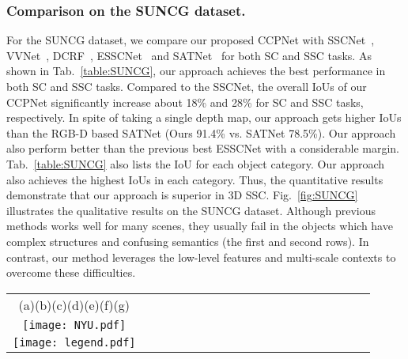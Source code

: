 \documentclass[10pt,twocolumn,letterpaper]{article}
\begin{document}
\subsubsection{Comparison on the SUNCG dataset.}
For the SUNCG dataset, we compare our proposed CCPNet with SSCNet~\cite{song2017semantic}, VVNet~\cite{guo2018view}, DCRF~\cite{zhang2018semantic}, ESSCNet~\cite{zhang2018efficient} and SATNet~\cite{liu2018see} for both SC and SSC tasks.
As shown in Tab.~\ref{table:SUNCG}, our approach achieves the best performance in both SC and SSC tasks.
Compared to the SSCNet, the overall IoUs of our CCPNet significantly increase about 18\% and 28\% for SC and SSC tasks, respectively.
In spite of taking a single depth map, our approach gets higher IoUs than the RGB-D based SATNet (Ours 91.4\% vs. SATNet 78.5\%).
Our approach also perform better than the previous best ESSCNet with a considerable margin.
Tab.~\ref{table:SUNCG} also lists the IoU for each object category.
Our approach also achieves the highest IoUs in each category.
Thus, the quantitative results demonstrate that our approach is superior in 3D SSC.
Fig.~\ref{fig:SUNCG} illustrates the qualitative results on the SUNCG dataset.
Although previous methods works well for many scenes, they usually fail in the objects which have complex structures and confusing semantics (the first and second rows).
In contrast, our method leverages the low-level features and multi-scale contexts to overcome these difficulties.
\begin{figure*}
\centering
\resizebox{1\textwidth}{!}
{
\begin{tabular}{@{}c@{}c@{}c@{}c@{}c@{}c@{}c@{}c@{}c@{}c@{}c@{}c@{}c@{}c@{}c@{}c@{}c@{}c@{}c}
(a)\hspace{2.2cm}(b)\hspace{2cm}(c)\hspace{2cm}(d)\hspace{2cm}(e)\hspace{2cm}(f)\hspace{2.2cm}(g)\\
\texttt{[image: NYU.pdf]} \\
\texttt{[image: legend.pdf]} \\
\end{tabular}
}
\caption{Completion results with different methods on the NYU dataset.
From the left to right: (a) Input Depth; (b) fTSDF Surface; (c) Ground Truth; (d) SSCNet~\cite{song2017semantic}; (e) DDRNet~\cite{li2019rgbd}; (f) VVNet~\cite{guo2018view}; (g) Ours. The figure is best viewed in color with 200\% zooming-in.}
\vspace{-4mm}
\label{fig:NYU}
\end{figure*}
\vspace{-2mm}
\end{document}
